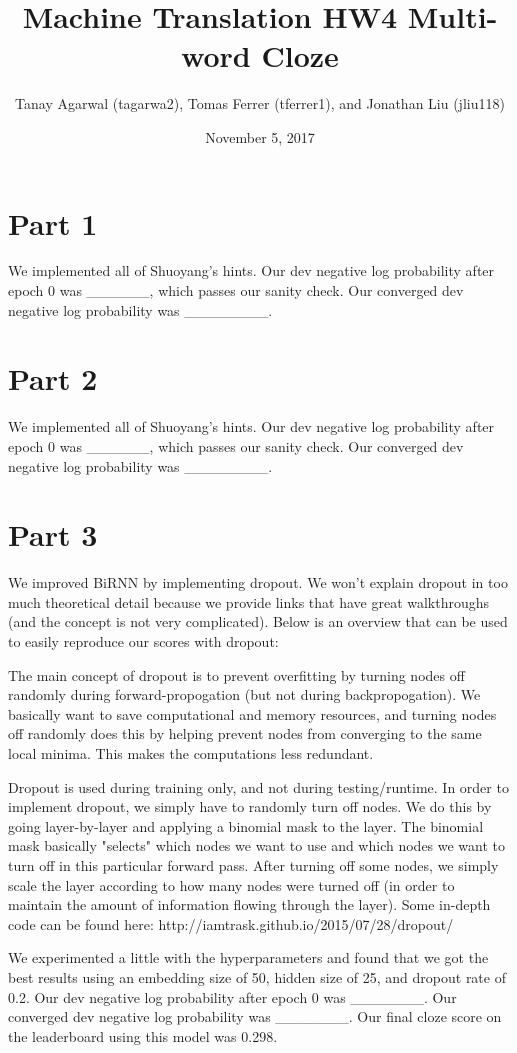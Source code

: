 \documentclass{article}
\title{Machine Translation HW4 Multi-word Cloze}
\author{Tanay Agarwal (tagarwa2), Tomas Ferrer (tferrer1), and Jonathan Liu (jliu118)}
\date{November 5, 2017}
\begin{document}
\maketitle


\section{Part 1}

We implemented all of Shuoyang's hints. Our dev negative log probability after epoch 0 was ______, which passes our sanity check. Our converged dev negative log probability was ________.

\section{Part 2}

We implemented all of Shuoyang's hints. Our dev negative log probability after epoch 0 was ______, which passes our sanity check. Our converged dev negative log probability was ________.

\section{Part 3}

We improved BiRNN by implementing dropout. We won't explain dropout in too much theoretical detail because we provide links that have great walkthroughs (and the concept is not very complicated). Below is an overview that can be used to easily reproduce our scores with dropout:

The main concept of dropout is to prevent overfitting by turning nodes off randomly during forward-propogation (but not during backpropogation). We basically want to save computational and memory resources, and turning nodes off randomly does this by helping prevent nodes from converging to the same local minima. This makes the computations less redundant.

Dropout is used during training only, and not during testing/runtime. In order to implement dropout, we simply have to randomly turn off nodes. We do this by going layer-by-layer and applying a binomial mask to the layer. The binomial mask basically "selects" which nodes we want to use and which nodes we want to turn off in this particular forward pass. After turning off some nodes, we simply scale the layer according to how many nodes were turned off (in order to maintain the amount of information flowing through the layer). Some in-depth code can be found here: http://iamtrask.github.io/2015/07/28/dropout/

We experimented a little with the hyperparameters and found that we got the best results using an embedding size of 50, hidden size of 25, and dropout rate of 0.2. Our dev negative log probability after epoch 0 was _______. Our converged dev negative log probability was _______. Our final cloze score on the leaderboard using this model was 0.298. 
\end{document}
